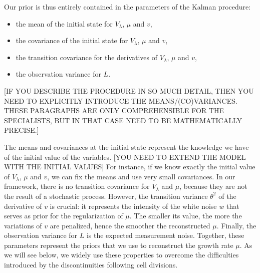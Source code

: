 Our prior is thus entirely contained in the parameters of the Kalman procedure:
\begin{itemize}
\item the mean of the initial state for $V_\lambda$, $\mu$ and $v$,
\item the covariance of the initial state for $V_\lambda$, $\mu$ and $v$,
\item the transition covariance for the derivatives of $V_\lambda$, $\mu$ and $v$,
\item the observation variance for $L$.
\end{itemize}
[IF YOU DESCRIBE THE PROCEDURE IN SO MUCH DETAIL, THEN YOU NEED TO EXPLICITLY INTRODUCE THE MEANS/(CO)VARIANCES. THESE PARAGRAPHS ARE ONLY COMPREHENSIBLE FOR THE SPECIALISTS, BUT IN THAT CASE NEED TO BE MATHEMATICALLY PRECISE.]

The means and covariances at the initial state represent the knowledge we have of the initial value of the variables. [YOU NEED TO EXTEND THE MODEL WITH THE INITIAL VALUES]
For instance, if we know exactly the initial value of $V_\lambda$, $\mu$ and $v$, we can fix the means and use very small covariances.
In our framework, there is no transition covariance for $V_\lambda$ and $\mu$, because they are not the result of a stochastic process.
However, the transition variance $\theta^2$ of the derivative of $v$ is crucial: it represents the intensity of the white noise $w$ that serves as prior for the regularization of $\mu$.
The smaller its value, the more the variations of $v$ are penalized, hence the smoother the reconstructed $\mu$.
Finally, the observation variance for $L$ is the expected measurement noise.
Together,  these parameters represent the priors that we use to reconstruct the growth rate $\mu$.
As we will see below, we widely use these properties to overcome the difficulties introduced by the discontinuities following cell divisions.

